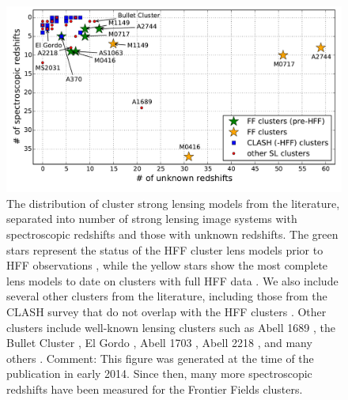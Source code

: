\begin{figure}
\center
\includegraphics[width=\textwidth]{Chap3/c3f1.pdf}
\caption[Strong lensing models from the literature]{The distribution of cluster strong lensing models from the literature, separated into number of strong lensing image systems with spectroscopic redshifts and those with unknown redshifts. The green stars represent the status of the HFF cluster lens models prior to HFF observations \citep{Johnson:2014tg,Richard:2014gf}, while the yellow stars show the most complete lens models to date on clusters with full HFF data \citep{Caminha:2017rw,Limousin:2016ty,Kawamata:2016nr,Treu:2016lr,Jauzac:2016dn,Jauzac:2014qd,Jauzac:2015xy}. We also include several other clusters from the literature, including those from the CLASH survey that do not overlap with the HFF clusters \citep{Zitrin:2015lq}. Other clusters include well-known lensing clusters such as Abell 1689 \citep{Diego:2015tg}, the Bullet Cluster \citep{Bradac:2009qd}, El Gordo \citep{Zitrin:2013hl}, Abell 1703 \citep{Limousin:2008lr}, Abell 2218 \citep{Eliasdottir:2007ve}, and many others \citep{Sharon:2015xe,Richard:2015lr,Richard:2010zp,Richard:2007rr,Sharon:2014fj,Bayliss:2014lr,Sharon:2012ly,Zitrin:2011qy}. Comment: This figure was generated at the time of the publication in early 2014. Since then, many more spectroscopic redshifts have been measured for the Frontier Fields clusters.}
\label{chap3:fig:slclusters}
\end{figure}

